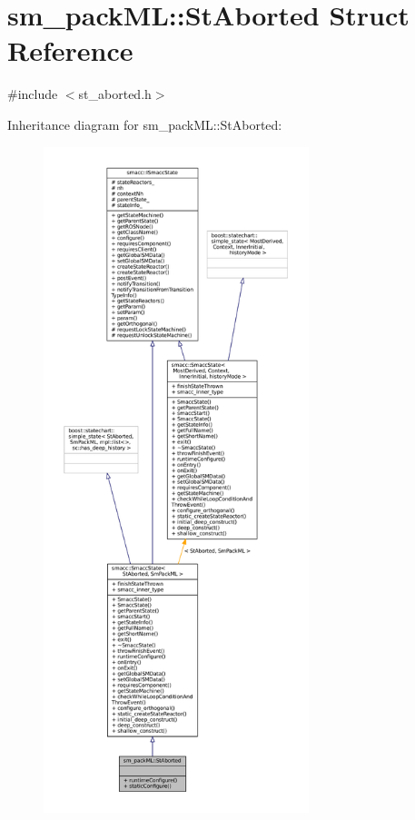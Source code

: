 \hypertarget{structsm__packML_1_1StAborted}{}\section{sm\+\_\+pack\+ML\+:\+:St\+Aborted Struct Reference}
\label{structsm__packML_1_1StAborted}


{\ttfamily \#include $<$st\+\_\+aborted.\+h$>$}



Inheritance diagram for sm\+\_\+pack\+ML\+:\+:St\+Aborted\+:
\nopagebreak
\begin{figure}[H]
\begin{center}
\leavevmode
\includegraphics[height=550pt]{structsm__packML_1_1StAborted__inherit__graph}
\end{center}
\end{figure}


